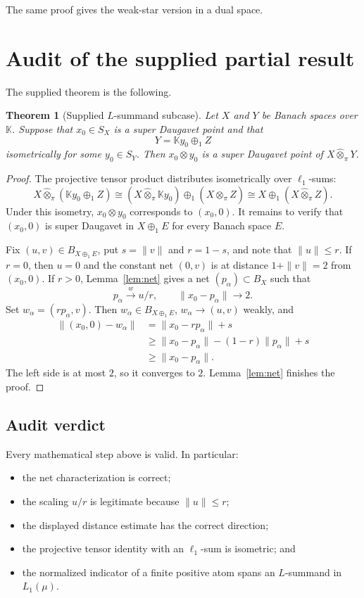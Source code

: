 \documentclass[11pt]{article}
\newtheorem{theorem}{Theorem}[section]
\theoremstyle{definition}
\newcommand{\K}{\mathbb K}
\newcommand{\whotpi}{\widehat{\otimes}_{\pi}}
\begin{document}
The same proof gives the weak-star version in a dual space.

\section{Audit of the supplied partial result}\label{sec:audit}

The supplied theorem is the following.

\begin{theorem}[Supplied $L$-summand subcase]\label{thm:supplied}
Let $X$ and $Y$ be Banach spaces over $\K$.  Suppose that $x_0\in S_X$ is a
super Daugavet point and that
\[
       Y=\K y_0\oplus_1 Z
\]
isometrically for some $y_0\in S_Y$.  Then $x_0\otimes y_0$ is a super
Daugavet point of $X\whotpi Y$.
\end{theorem}

\begin{proof}
The projective tensor product distributes isometrically over $\ell_1$-sums:
\[
 X\whotpi(\K y_0\oplus_1 Z)
 \cong (X\whotpi\K y_0)\oplus_1(X\whotpi Z)
 \cong X\oplus_1(X\whotpi Z).
\]
Under this isometry, $x_0\otimes y_0$ corresponds to $(x_0,0)$.  It remains
to verify that $(x_0,0)$ is super Daugavet in $X\oplus_1 E$ for every Banach
space $E$.

Fix $(u,v)\in B_{X\oplus_1 E}$, put $s=\|v\|$ and $r=1-s$, and note that
$\|u\|\le r$.  If $r=0$, then $u=0$ and the constant net $(0,v)$ is at
distance $1+\|v\|=2$ from $(x_0,0)$.  If $r>0$, Lemma~\ref{lem:net} gives a
net $(p_\alpha)\subset B_X$ such that
\[
 p_\alpha\xrightarrow{w}u/r,
 \qquad \|x_0-p_\alpha\|\longrightarrow2.
\]
Set $w_\alpha=(rp_\alpha,v)$.  Then $w_\alpha\in B_{X\oplus_1 E}$,
$w_\alpha\to(u,v)$ weakly, and
\begin{align*}
 \|(x_0,0)-w_\alpha\|
 &=\|x_0-rp_\alpha\|+s\\
 &\ge \|x_0-p_\alpha\|-(1-r)\|p_\alpha\|+s\\
 &\ge \|x_0-p_\alpha\|.
\end{align*}
The left side is at most $2$, so it converges to $2$.  Lemma~\ref{lem:net}
finishes the proof.
\end{proof}

\subsection*{Audit verdict}
Every mathematical step above is valid.  In particular:
\begin{itemize}[leftmargin=1.8em]
\item the net characterization is correct;
\item the scaling $u/r$ is legitimate because $\|u\|\le r$;
\item the displayed distance estimate has the correct direction;
\item the projective tensor identity with an $\ell_1$-sum is isometric; and
\item the normalized indicator of a finite positive atom spans an
      $L$-summand in $L_1(\mu)$.
\end{itemize}
\end{document}
